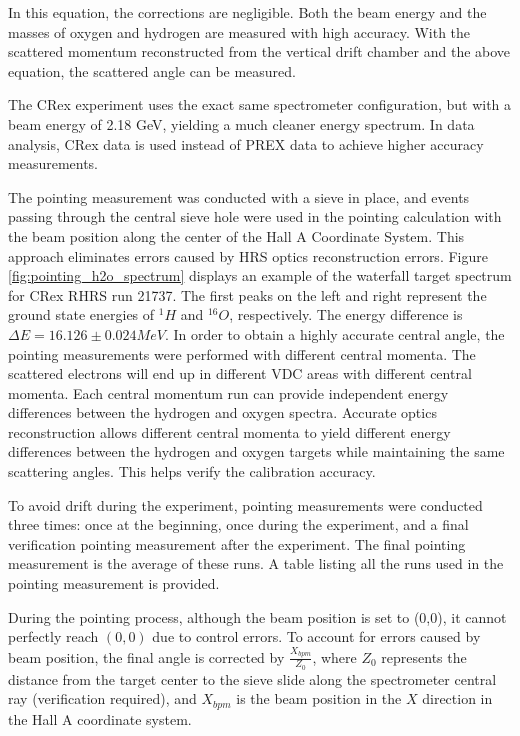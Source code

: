 In this equation, the corrections are negligible. Both the beam energy and the masses of oxygen and hydrogen are measured with high accuracy. With the scattered momentum reconstructed from the vertical drift chamber and the above equation, the scattered angle can be measured.

The CRex experiment uses the exact same spectrometer configuration, but with a beam energy of 2.18 GeV, yielding a much cleaner energy spectrum. In data analysis, CRex data is used instead of PREX data to achieve higher accuracy measurements.

The pointing measurement was conducted with a sieve in place, and events passing through the central sieve hole were used in the pointing calculation with the beam position along the center of the Hall A Coordinate System. This approach eliminates errors caused by HRS optics reconstruction errors. Figure \ref{fig:pointing_h2o_spectrum} displays an example of the waterfall target spectrum for CRex RHRS run 21737. The first peaks on the left and right represent the ground state energies of $^{1}H$ and $^{16}O$, respectively. The energy difference is $\Delta E = 16.126 \pm 0.024 MeV$. In order to obtain a highly accurate central angle, the pointing measurements were performed with different central momenta. The scattered electrons will end up in different VDC areas with different central momenta. Each central momentum run can provide independent energy differences between the hydrogen and oxygen spectra. Accurate optics reconstruction allows different central momenta to yield different energy differences between the hydrogen and oxygen targets while maintaining the same scattering angles. This helps verify the calibration accuracy.

To avoid drift during the experiment, pointing measurements were conducted three times: once at the beginning, once during the experiment, and a final verification pointing measurement after the experiment. The final pointing measurement is the average of these runs. A table listing all the runs used in the pointing measurement is provided.

During the pointing process, although the beam position is set to (0,0), it cannot perfectly reach $(0,0)$ due to control errors. To account for errors caused by beam position, the final angle is corrected by $\frac{X_{bpm}}{Z_0}$, where $Z_0$ represents the distance from the target center to the sieve slide along the spectrometer central ray (verification required), and $X_{bpm}$ is the beam position in the $X$ direction in the Hall A coordinate system.  

